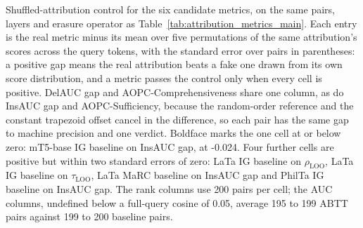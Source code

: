 \begin{table}[t]
\caption{Shuffled-attribution control for the six candidate metrics, on the same pairs, layers and erasure operator as Table~\ref{tab:attribution_metrics_main}. Each entry is the real metric minus its mean over five permutations of the same attribution's scores across the query tokens, with the standard error over pairs in parentheses: a positive gap means the real attribution beats a fake one drawn from its own score distribution, and a metric passes the control only when every cell is positive. DelAUC gap and AOPC-Comprehensiveness share one column, as do InsAUC gap and AOPC-Sufficiency, because the random-order reference and the constant trapezoid offset cancel in the difference, so each pair has the same gap to machine precision and one verdict. Boldface marks the one cell at or below zero: mT5-base IG baseline on InsAUC gap, at -0.024. Four further cells are positive but within two standard errors of zero: LaTa IG baseline on $\rho_{\text{LOO}}$, LaTa IG baseline on $\tau_{\text{LOO}}$, LaTa MaRC baseline on InsAUC gap and PhilTa IG baseline on InsAUC gap. The rank columns use 200 pairs per cell; the AUC columns, undefined below a full-query cosine of 0.05, average 195 to 199 ABTT pairs against 199 to 200 baseline pairs.}
\label{tab:attribution_shuffle_control}
\end{table}
